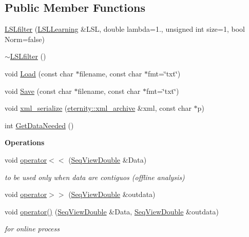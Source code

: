 \subsection*{Public Member Functions}
\begin{DoxyCompactItemize}
\item 
\hyperlink{classtsa_1_1_l_s_lfilter_a7f49b52bb9e1b935f957e04166bf7c8c}{L\+S\+Lfilter} (\hyperlink{classtsa_1_1_l_s_l_learning}{L\+S\+L\+Learning} \&L\+SL, double lambda=1., unsigned int size=1, bool Norm=false)
\item 
\hyperlink{classtsa_1_1_l_s_lfilter_addf16b957be6c848ad1c59ee7cb4dd4e}{$\sim$\+L\+S\+Lfilter} ()
\item 
void \hyperlink{classtsa_1_1_l_s_lfilter_a737d772a9b51efdd71a01178ec83597f}{Load} (const char $\ast$filename, const char $\ast$fmt=\char`\"{}txt\char`\"{})
\item 
void \hyperlink{classtsa_1_1_l_s_lfilter_ae8aa6f5275313f49e88bf4f6361092f9}{Save} (const char $\ast$filename, const char $\ast$fmt=\char`\"{}txt\char`\"{})
\item 
void \hyperlink{classtsa_1_1_l_s_lfilter_a1adaa3058f09e50b73a88520844d2b90}{xml\+\_\+serialize} (\hyperlink{classeternity_1_1xml__archive}{eternity\+::xml\+\_\+archive} \&xml, const char $\ast$p)
\item 
int \hyperlink{classtsa_1_1_l_s_lfilter_a236a35327bce862b6c4f8a9245af7b9c}{Get\+Data\+Needed} ()
\end{DoxyCompactItemize}
\begin{Indent}\textbf{ Operations}\par
\begin{DoxyCompactItemize}
\item 
void \hyperlink{classtsa_1_1_l_s_lfilter_a4308a18bd0ecc82242c4df0529c1f573}{operator$<$$<$} (\hyperlink{namespacetsa_ac599574bcc094eda25613724b8f3ca9e}{Seq\+View\+Double} \&Data)
\begin{DoxyCompactList}\small\item\em to be used only when data are contiguos (offline analysis) \end{DoxyCompactList}\item 
void \hyperlink{classtsa_1_1_l_s_lfilter_a8b0ecd9fa51d407daf718ac91776ebed}{operator$>$$>$} (\hyperlink{namespacetsa_ac599574bcc094eda25613724b8f3ca9e}{Seq\+View\+Double} \&outdata)
\item 
void \hyperlink{classtsa_1_1_l_s_lfilter_a7a6f64f53279b310e23cb034ab1d9a99}{operator()} (\hyperlink{namespacetsa_ac599574bcc094eda25613724b8f3ca9e}{Seq\+View\+Double} \&Data, \hyperlink{namespacetsa_ac599574bcc094eda25613724b8f3ca9e}{Seq\+View\+Double} \&outdata)
\begin{DoxyCompactList}\small\item\em for online process \end{DoxyCompactList}\end{DoxyCompactItemize}
\end{Indent}
